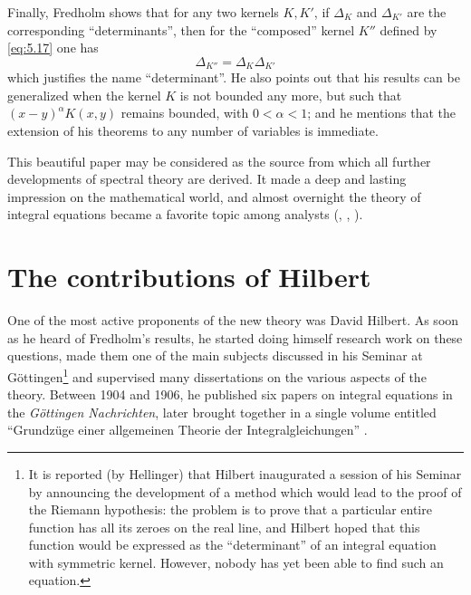\documentclass[12pt,a4paper,leqno,twoside]{extbook}
\begin{document}
Finally, Fredholm shows that for any two kernels \(K, K'\), if \(\Delta_K\) and \(\Delta_{K'}\) are the corresponding ``determinants'', then for the ``composed'' kernel \(K''\) defined by \eqref{eq:5.17} one has
\begin{equation}
    \label{eq:5.23}
    \Delta_{K''} = \Delta_K \Delta_{K'}
\end{equation}
which justifies the name ``determinant''. He also points out that his results can be generalized when the kernel \(K\) is not bounded any more, but such that \((x-y)^\alpha K(x, y)\) remains bounded, with \(0 < \alpha < 1\); and he mentions that the extension of his theorems to any number of variables is immediate.

This beautiful paper may be considered as the source from which all further developments of spectral theory are derived. It made a deep and lasting impression on the mathematical world, and almost overnight the theory of integral equations became a favorite topic among analysts (\cite{023}, \cite{175}, \cite{107}).

\section{The contributions of Hilbert}
\label{sec:5.2}

One of the most active proponents of the new theory was David Hilbert. As soon as he heard of Fredholm's results, he started doing himself research work on these questions, made them one of the main subjects discussed in his Seminar at Göttingen\footnote{It is reported (by Hellinger) that Hilbert inaugurated a session of his Seminar by announcing the development of a method which would lead to the proof of the Riemann hypothesis: the problem is to prove that a particular entire function has all its zeroes on the real line, and Hilbert hoped that this function would be expressed as the ``determinant'' of an integral equation with symmetric kernel. However, nobody has yet been able to find such an equation.} and supervised many dissertations on the various aspects of the theory. Between 1904 and 1906, he published six papers on integral equations in the \emph{Göttingen Nachrichten}, later brought together in a single volume entitled ``Grundzüge einer allgemeinen Theorie der Integralgleichungen'' \cite{112}.
\end{document}
